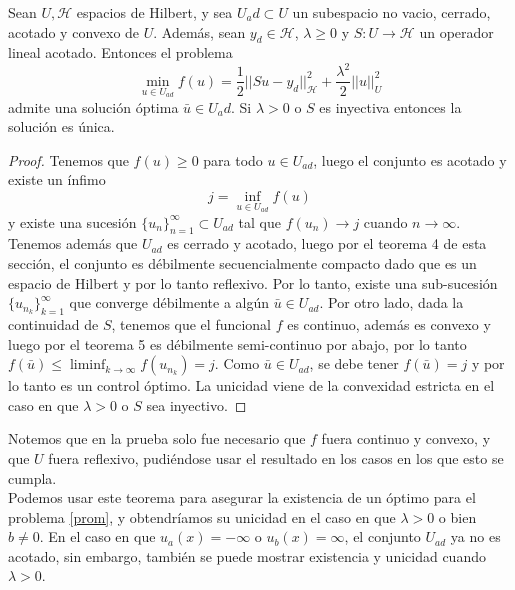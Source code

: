 \documentclass{article}
\begin{document}
\begin{theorem}
Sean $U,\mathcal{H}$ espacios de Hilbert, y sea $U_ad\subset U$ un subespacio no vacio, cerrado, acotado y convexo de $U$. Además, sean $y_d\in \mathcal{H}$, $\lambda\geq 0$ y $S:U\to \mathcal{H}$ un operador lineal acotado. Entonces el problema 
\begin{equation}
    \min_{u\in U_{ad}}f(u)=\frac{1}{2}||Su-y_d||_{\mathcal{H}}^2+\frac{\lambda^2}{2}||u||_{U}^2
\end{equation}
admite una solución óptima $\bar{u}\in U_ad$. Si $\lambda>0$ o $S$ es inyectiva entonces la solución es única.
\end{theorem}
\begin{proof}
Tenemos que $f(u)\geq 0$ para todo $u\in U_{ad}$, luego el conjunto es acotado y existe un ínfimo
\begin{equation*}
    j=\inf_{u\in U_{ad}}f(u)
\end{equation*}
y existe una sucesión $\{u_n\}_{n=1}^{\infty} \subset U_{ad}$ tal que $f(u_n)\to j$ cuando $n\to \infty$. Tenemos además que $U_{ad}$ es cerrado y acotado, luego por el teorema 4 de esta sección, el conjunto es débilmente secuencialmente compacto dado que es un espacio de Hilbert y por lo tanto reflexivo. Por lo tanto, existe una sub-sucesión $\{u_{n_k}\}_{k=1}^{\infty}$ que converge débilmente a algún $\bar{u}\in U_{ad}$. Por otro lado, dada la continuidad de $S$, tenemos que el funcional $f$ es continuo, además es convexo y luego por el teorema 5 es débilmente semi-continuo por abajo, por lo tanto $f(\bar{u})\leq \liminf_{k\to \infty} f(u_{n_k})=j$. Como $\bar{u}\in U_{ad}$, se debe tener $f(\bar{u})=j$ y por lo tanto es un control óptimo. La unicidad viene de la convexidad estricta en el caso en que $\lambda>0$ o $S$ sea inyectivo.
\end{proof}

\noindent
Notemos que en la prueba solo fue necesario que $f$ fuera continuo y convexo, y que $U$ fuera reflexivo, pudiéndose usar el resultado en los casos en los que esto se cumpla.\\

\noindent
Podemos usar este teorema para asegurar la existencia de un óptimo para el problema \ref{prom}, y obtendríamos su unicidad en el caso en que $\lambda>0$ o bien $b\neq 0$. En el caso en que $u_a(x)=-\infty$ o $u_b(x)=\infty$, el conjunto $U_{ad}$ ya no es acotado, sin embargo, también se puede mostrar existencia y unicidad cuando $\lambda>0$.\\
\end{document}

